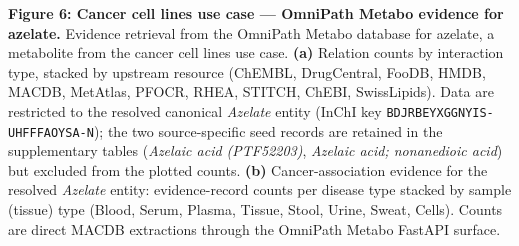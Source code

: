 \textbf{Figure 6: Cancer cell lines use case --- OmniPath Metabo evidence for azelate.}
Evidence retrieval from the OmniPath Metabo database for azelate, a metabolite from the cancer cell lines use case.
\textbf{(a)} Relation counts by interaction type, stacked by upstream resource (ChEMBL, DrugCentral, FooDB, HMDB, MACDB, MetAtlas, PFOCR, RHEA, STITCH, ChEBI, SwissLipids). Data are restricted to the resolved canonical \emph{Azelate} entity (InChI key \texttt{BDJRBEYXGGNYIS-UHFFFAOYSA-N}); the two source-specific seed records are retained in the supplementary tables (\textit{Azelaic acid (PTF52203)}, \textit{Azelaic acid; nonanedioic acid}) but excluded from the plotted counts.
\textbf{(b)} Cancer-association evidence for the resolved \emph{Azelate} entity: evidence-record counts per disease type stacked by sample (tissue) type (Blood, Serum, Plasma, Tissue, Stool, Urine, Sweat, Cells). Counts are direct MACDB extractions through the OmniPath Metabo FastAPI surface.
